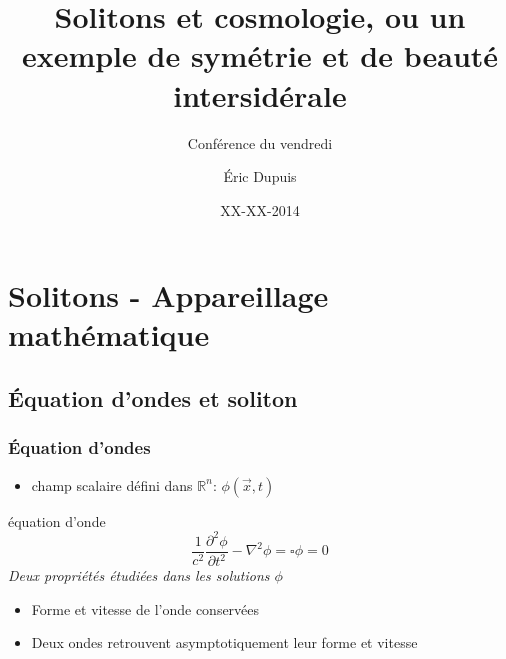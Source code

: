 \documentclass[handout]{beamer}
\title{Solitons et cosmologie, ou un exemple de symétrie et de beauté intersidérale}
\subtitle{Conférence du vendredi}
\author{Éric Dupuis}
\institute{Université de Montréal, département de physique des particules}
\date{XX-XX-2014}
\begin{document}
\begin{frame}
\titlepage
\end{frame}
%

\section*{}
\begin{frame}
\tableofcontents
\end{frame}

\section{Solitons - Appareillage mathématique }


\subsection{Équation d'ondes et soliton}
\begin{frame}
\frametitle{Équation d'ondes}
\begin{itemize}
\item  champ scalaire défini dans $\mathbb{R}^n$: $\phi(\vec{x},t)$\\
\end{itemize}
\begin{block}{équation d'onde}
\begin{equation}
\frac{1}{c^2}\frac{\partial^2 \phi}{\partial t^2} - \nabla^2 \phi = \square \phi = 0 
\end{equation}
\textit{Deux propriétés étudiées dans les solutions $\phi$}
\begin{itemize}
\item Forme et vitesse de l'onde conservées\\
\item Deux ondes retrouvent asymptotiquement leur forme et vitesse\\
\end{itemize}
\end{block} 
\end{frame}
\end{document}
